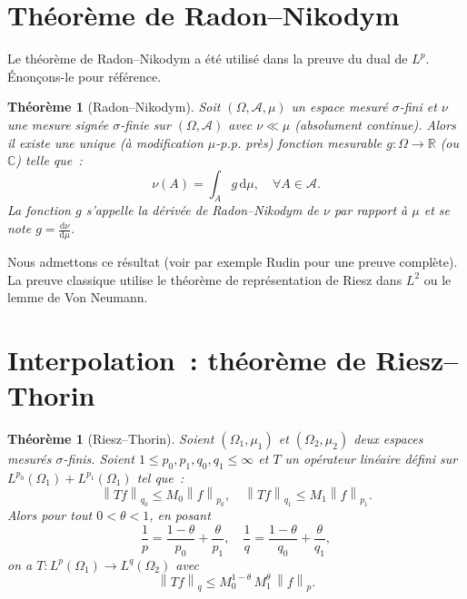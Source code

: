 \documentclass[a4paper,12pt]{book}
\newcommand{\R}{\mathbb{R}}
\newcommand{\C}{\mathbb{C}}
\newcommand{\dd}{\mathrm{d}}
\newcommand{\norm}[1]{\left\| #1 \right\|}
\theoremstyle{definition}
\theoremstyle{plain}
\newtheorem{theoreme}[definition]{Théorème}
\theoremstyle{remark}
\begin{document}
\section{Théorème de Radon--Nikodym}

Le théorème de Radon--Nikodym a été utilisé dans la preuve du dual de $L^p$. Énonçons-le
pour référence.

\begin{theoreme}[Radon--Nikodym]
\label{thm:radon-nikodym}
Soit $(\Omega, \mathcal{A}, \mu)$ un espace mesuré $\sigma$-fini et $\nu$ une mesure
signée $\sigma$-finie sur $(\Omega, \mathcal{A})$ avec $\nu \ll \mu$ (absolument
continue). Alors il existe une unique (à modification $\mu$-p.p. près) fonction mesurable
$g : \Omega \to \R$ (ou $\C$) telle que~:
\[
  \nu(A) = \int_A g\,\dd\mu, \quad \forall A \in \mathcal{A}.
\]
La fonction $g$ s'appelle la \emph{dérivée de Radon--Nikodym} de $\nu$ par rapport à
$\mu$ et se note $g = \frac{\dd\nu}{\dd\mu}$.
\end{theoreme}

Nous admettons ce résultat (voir par exemple Rudin \cite{rudin-real-complex} pour une
preuve complète). La preuve classique utilise le théorème de représentation de Riesz dans
$L^2$ ou le lemme de Von Neumann.

\section{Interpolation~: théorème de Riesz--Thorin}

\begin{theoreme}[Riesz--Thorin]
\label{thm:riesz-thorin}
Soient $(\Omega_1, \mu_1)$ et $(\Omega_2, \mu_2)$ deux espaces mesurés $\sigma$-finis.
Soient $1 \le p_0, p_1, q_0, q_1 \le \infty$ et $T$ un opérateur linéaire défini sur
$L^{p_0}(\Omega_1) + L^{p_1}(\Omega_1)$ tel que~:
\[
  \norm{Tf}_{q_0} \le M_0 \norm{f}_{p_0}, \quad
  \norm{Tf}_{q_1} \le M_1 \norm{f}_{p_1}.
\]
Alors pour tout $0 < \theta < 1$, en posant
\[
  \frac{1}{p} = \frac{1-\theta}{p_0} + \frac{\theta}{p_1}, \quad
  \frac{1}{q} = \frac{1-\theta}{q_0} + \frac{\theta}{q_1},
\]
on a $T : L^p(\Omega_1) \to L^q(\Omega_2)$ avec
\[
  \norm{Tf}_q \le M_0^{1-\theta}\, M_1^\theta \, \norm{f}_p.
\]
\end{theoreme}
\end{document}
